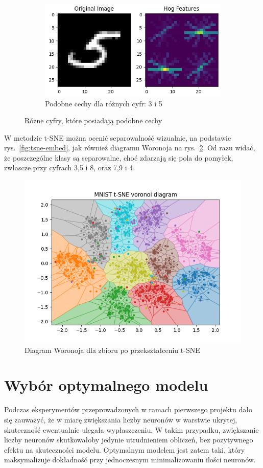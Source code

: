 \documentclass[10pt]{article}
\begin{document}
\begin{figure}[H]
\begin{subfigure}[t]{.2\textwidth}
        \includegraphics[width=\linewidth]{img/hog_similar/5.png}
        \caption{Podobne cechy dla różnych cyfr: 3 i 5}
    \end{subfigure}
    \caption{Różne cyfry, które posiadają podobne cechy}\label{fig:hig-similar}
\end{figure}

W metodzie t-SNE można ocenić separowalność wizualnie, na podstawie rys.~\ref{fig:tsne-embed},
jak również diagramu Woronoja na rys.~\ref{fig:tsne-voronoi}.
Od razu widać, że poszczególne klasy są separowalne, choć zdarzają się pola do pomyłek, zwłascze przy cyfrach 3,5 i 8, oraz 7,9 i 4.


\begin{figure}[H]\centering
    \includegraphics[width=.4\linewidth]{img/mnist_tsne_voronoi.png}
    \caption{Diagram Woronoja dla zbioru po przekształceniu t-SNE}\label{fig:tsne-voronoi}
\end{figure}


\pagebreak
\section{Wybór optymalnego modelu}

Podczas eksperymentów przeprowadzonych w ramach pierwszego projektu dało się zauważyć, że w miarę zwiększania
liczby neuronów w warstwie ukrytej, skuteczność ewentualnie ulegała wypłaszczeniu.
W takim przypadku, zwiększanie liczby neuronów skutkowałoby jedynie utrudnieniem obliczeń, bez pozytywnego efektu na skuteczności modelu.
Optymalnym modelem jest zatem taki, który maksymalizuje dokładność przy jednoczesnym minimalizowaniu ilości neuronów.
\end{document}
